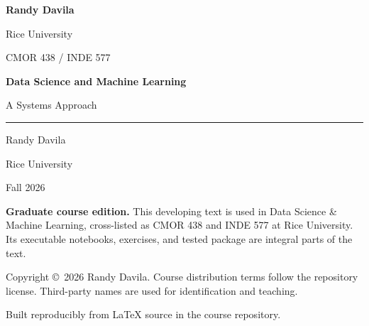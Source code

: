\begin{titlepage}
\vfill
\begin{minipage}{0.82\textwidth}
  {\color{white}\sffamily\bfseries\Large Randy Davila\par}
  \vspace{0.04in}
  {\color{white!72}\sffamily\large Rice University\par}

  \vspace{0.34in}
  {\color{white!65}\sffamily\small
  CMOR 438 / INDE 577\quad\textbar\quad\bookversion\par}
\end{minipage}
\vspace*{0.24in}
\end{titlepage}

\clearpage
\thispagestyle{empty}

\vspace*{0.72in}
{\color{RiceBlue}\sffamily\bfseries\fontsize{24}{29}\selectfont
Data Science and Machine Learning\par}
\vspace{0.11in}
{\color{RiceGray}\sffamily\fontsize{13}{17}\selectfont
A Systems Approach\par}

\vspace{0.38in}
{\color{RiceGold}\rule{1.05in}{1.6pt}\par}
\vspace{0.28in}
{\sffamily\large Randy Davila\par}
{\sffamily Rice University\par}
\vspace{0.16in}
{\sffamily\small \course\quad\textbar\quad Fall 2026\par}

\vfill
\begin{minipage}{0.84\textwidth}
\small
\textbf{Graduate course edition.} This developing text is used in Data Science
\& Machine Learning, cross-listed as CMOR 438 and INDE 577 at Rice University.
Its executable notebooks, exercises, and tested  package are
integral parts of the text.

\medskip
Copyright \copyright\ 2026 Randy Davila. Course distribution terms follow the
repository license. Third-party names are used for identification and teaching.

\medskip
Built reproducibly from LaTeX source in the course repository.
\end{minipage}
\vspace*{0.35in}
\clearpage
